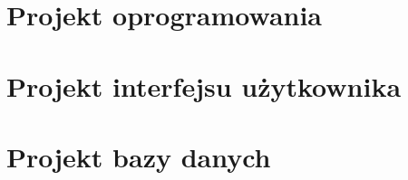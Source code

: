 \documentclass{sprawozdanie-agh}
\begin{document}
	\section{Projekt oprogramowania}
	
		

	\section{Projekt interfejsu użytkownika}

	\section{Projekt bazy danych}
\end{document}
